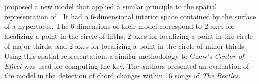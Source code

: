

\textcite{harte2006detecting} proposed a new model that
applied a similar principle to the spatial representation of
\textcite{chew2000towards}. It had a 6-dimensional interior
space contained by the surface of a hypertorus. The 6
dimensions of their model correspond to 2-axes for
localizing a point in the circle of fifths, 2-axes for
localizing a point in the circle of major thirds, and 2-axes
for localizing a point in the circle of minor thirds. Using
this spatial representation, a similar methodology to Chew's
\emph{Center of Effect} \parencite{chew2002spiral} was used
for computing the key. The authors presented an evaluation
of the model in the detection of chord changes within 16
songs of \emph{The Beatles}.




